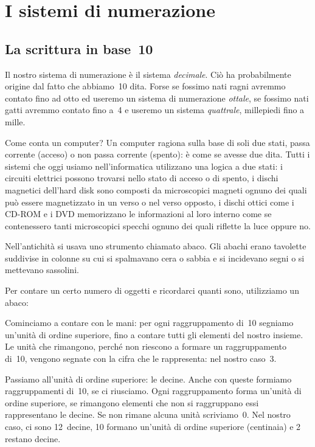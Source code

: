 \chapter{I sistemi di numerazione}
\section{La scrittura in base~10}
Il nostro sistema di numerazione è il sistema \emph{decimale}. Ciò ha
probabilmente origine dal fatto che abbiamo~10 dita. Forse se fossimo
nati ragni avremmo contato fino ad otto ed useremo un sistema di
numerazione \emph{ottale}, se fossimo nati gatti avremmo contato fino a~4 e
useremo un sistema \emph{quattrale}, millepiedi fino a mille.

Come conta un
computer? Un computer ragiona sulla base di soli due stati, passa corrente (acceso) o non
passa corrente (spento): è come se avesse due dita. Tutti i sistemi che oggi
usiamo nell'informatica utilizzano una logica a due stati: i circuiti elettrici possono trovarsi nello stato di acceso o di spento, i dischi magnetici
dell'hard disk sono composti da microscopici magneti ognuno dei quali può essere magnetizzato in un verso o nel verso opposto, i dischi
ottici come i CD-ROM
e i DVD memorizzano le informazioni al loro interno come se contenessero tanti microscopici specchi ognuno dei quali riflette la luce oppure no.

Nell'antichità si usava uno strumento chiamato abaco. Gli abachi erano tavolette suddivise in colonne su cui si spalmavano
cera o sabbia e si incidevano segni o si mettevano sassolini.

Per contare un certo numero di oggetti e ricordarci quanti sono, utilizziamo un abaco:
\begin{center}

\end{center}

Cominciamo a contare con le mani: per ogni raggruppamento di~10 segniamo un'unità di ordine superiore, fino a contare tutti
gli elementi del nostro insieme. Le unità che rimangono, perché non riescono a formare un raggruppamento di~10, vengono
segnate con la cifra che le rappresenta: nel nostro caso~3.

Passiamo all'unità di ordine superiore: le decine. Anche con queste formiamo raggruppamenti di~10, se ci riusciamo. Ogni
raggruppamento forma un'unità di ordine superiore, se rimangono elementi che non si raggruppano essi rappresentano le decine. Se non
rimane alcuna unità scriviamo~0. Nel nostro caso, ci sono 12~decine, 10 formano un'unità di ordine superiore (centinaia) e 2 restano decine.

